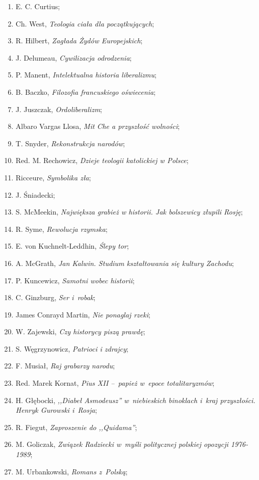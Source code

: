 \documentclass[a4paper,11pt]{article}
\begin{document}
\begin{enumerate}
\item E. C. Curtius;
\item Ch. West, \emph{Teologia ciała dla początkujących};
\item R. Hilbert, \emph{Zagłada Żydów Europejskich};
\item J. Delumeau, \emph{Cywilizacja odrodzenia};
\item P. Manent, \emph{Intelektualna historia liberalizmu};
\item B. Baczko, \emph{Filozofia francuskiego oświecenia};
\item J. Juszczak, \emph{Ordoliberalizm};
\item Albaro Vargas Llosa, \emph{Mit Che a przyszłość wolności};
\item T. Snyder, \emph{Rekonstrukcja narodów};
\item Red. M. Rechowicz, \emph{Dzieje teologii katolickiej w Polsce};
\item Ricceure, \emph{Symbolika zła};
\item J. Śniadecki;
\item S. McMeekin, \emph{Największa grabież w historii. Jak bolszewicy
    złupili Rosję};
\item R. Syme, \emph{Rewolucja rzymska};
\item E. von Kuchnelt-Leddhin, \emph{Ślepy tor};
\item A. McGrath, \emph{Jan Kalwin. Studium kształtowania się kultury
    Zachodu};
\item P. Kuncewicz, \emph{Samotni wobec historii};
\item C. Ginzburg, \emph{Ser i~robak};
\item James Conrayd Martin, \emph{Nie ponaglaj rzeki};
\item W. Zajewski, \emph{Czy historycy piszą prawdę};
\item S. Węgrzynowicz, \emph{Patrioci i zdrajcy};
\item F. Musiał, \emph{Raj grabarzy narodu};
\item Red. Marek Kornat, \emph{Pius XII --~papież w~epoce
    totalitaryzmów};
\item H. Głębocki, \emph{,,Diabeł Asmodeusz'' w~niebieskich binoklach
    i~kraj przyszłości. Henryk Gurowski i~Rosja};
\item R. Fiegut, \emph{Zaproszenie do ,,Quidama''};
\item M. Goliczak, \emph{Związek Radziecki w~myśli politycznej
    polskiej opozycji 1976-1989};
\item M. Urbankowski, \emph{Romans z~Polską};

\end{enumerate}
\end{document}
